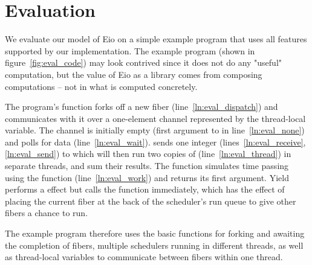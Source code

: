 \section{Evaluation}
\label{sec:evaluation}
We evaluate our model of Eio on a simple example program that uses all features supported by our implementation.
The example program (shown in figure~\ref{fig:eval_code}) may look contrived since it does not do any "useful" computation, but the value of Eio as a library comes from composing computations -- not in what is computed concretely.

The program's  function forks off a new fiber  (line~\ref{ln:eval_dispatch}) and communicates with it over a one-element channel represented by the thread-local variable.
The channel is initially empty (first argument to  in line~\ref{ln:eval_none}) and  polls for data (line~\ref{ln:eval_wait}).
 sends one integer  (lines~\ref{ln:eval_receive},\ref{ln:eval_send}) to  which will then run two copies of  (line~\ref{ln:eval_thread}) in separate threads, and sum their results.
The  function simulates time passing using the  function (line~\ref{ln:eval_work}) and returns its first argument.
Yield performs a \esuspend{} effect but calls the  function immediately, which has the effect of placing the current fiber at the back of the scheduler's run queue to give other fibers a chance to run.

The example program therefore uses the basic functions for forking and awaiting the completion of fibers, multiple schedulers running in different threads, as well as thread-local variables to communicate between fibers within one thread.

